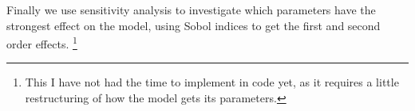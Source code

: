 Finally we use sensitivity analysis to investigate which parameters have the
strongest effect on the model, using Sobol indices to get the first and second
order effects. \footnote{This I have not had the time to implement in code yet,
as it requires a little restructuring of how the model gets its parameters.}

%
%

